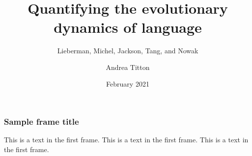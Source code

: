 \documentclass{beamer}
\title{Quantifying the evolutionary dynamics of language}
\subtitle{Lieberman, Michel, Jackson, Tang, and Nowak}
\author{Andrea Titton}
\date{February 2021}
\begin{document}
\frame{\titlepage}

\begin{frame}
    \frametitle{Sample frame title}
    This is a text in the first frame. This is a text in the first frame. This is a text in the first frame.
\end{frame}
\end{document}
